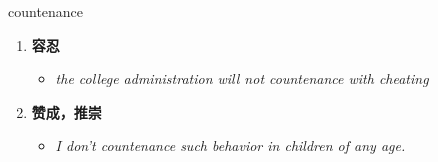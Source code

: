 
\begin{frame}
{\huge countenance}
\begin{center}
\begin{enumerate}\Large
  \item \textbf{容忍}
  \begin{itemize}
    \item \em{\Large{the college administration will not countenance with cheating}}
  \end{itemize}
  \item \textbf{赞成，推崇}
  \begin{itemize}
    \item \em{\Large{I don't countenance such behavior in children of any age.}}
  \end{itemize}
\end{enumerate}
\end{center}
\end{frame}
